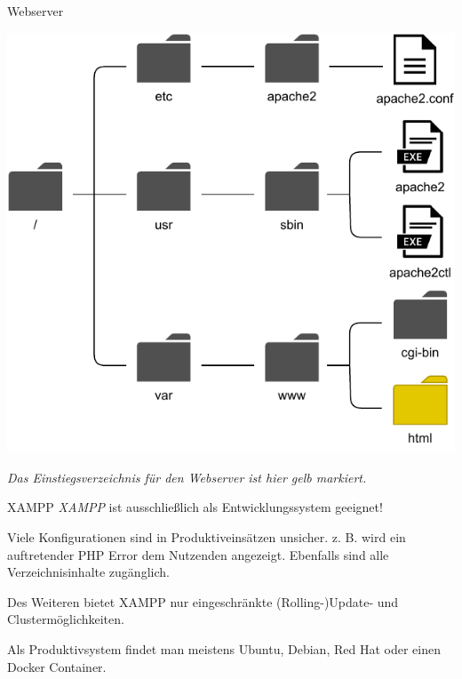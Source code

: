 \begin{defi}{Webserver}
\begin{minipage}[t]{0.45\textwidth}
        \includegraphics[width=\textwidth]{includes/figures/defi_apache.pdf}
    \end{minipage}

    \begin{center}
        \emph{Das Einstiegsverzeichnis für den Webserver ist hier gelb markiert.}
    \end{center}
\end{defi}

\begin{bonus}{XAMPP}
    \emph{XAMPP} ist ausschließlich als Entwicklungssystem geeignet!

    Viele Konfigurationen sind in Produktiveinsätzen unsicher.
    z. B. wird ein auftretender PHP Error dem Nutzenden angezeigt.
    Ebenfalls sind alle Verzeichnisinhalte zugänglich.

    Des Weiteren bietet XAMPP nur eingeschränkte (Rolling-)Update- und Clustermöglichkeiten.

    Als Produktivsystem findet man meistens Ubuntu, Debian, Red Hat oder einen Docker Container.
\end{bonus}